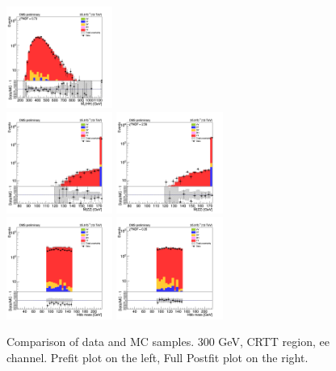 \begin{figure}[tbp]
\begin{center}
    \includegraphics[width=0.31\textwidth]{figures/ee_300_april18/hhMt_ee_CRTT_FullPostfit_plot_apr18.png}\\
    \includegraphics[width=0.31\textwidth]{figures/ee_300_april18/hmass0_ee_CRTT_prefit_plot_apr18.png}
    \includegraphics[width=0.31\textwidth]{figures/ee_300_april18/hmass0_ee_CRTT_FullPostfit_plot_apr18.png}\\
    \includegraphics[width=0.31\textwidth]{figures/ee_300_april18/hmass1_ee_CRTT_prefit_plot_apr18.png}
    \includegraphics[width=0.31\textwidth]{figures/ee_300_april18/hmass1_ee_CRTT_FullPostfit_plot_apr18.png}\\
    \caption{Comparison of data and MC samples. 300 GeV, CRTT region, ee channel. Prefit plot on the left,           Full Postfit plot on the right.}
    \label{fig:MCcomparisons_ee_low_CRTT}
  \end{center}
\end{figure}

